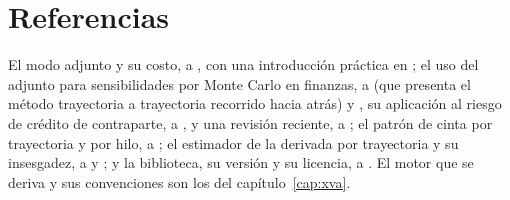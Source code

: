 \section{Referencias}\label{sec:cap16-referencias}

El modo adjunto y su costo, a \citet{griewank2008}, con una introducción práctica en \citet{naumann2011}; el uso del
adjunto para sensibilidades por Monte Carlo en finanzas, a \citet{giles2005} (que presenta el método
trayectoria a trayectoria recorrido hacia atrás) y \citet{capriotti2011}, su aplicación al riesgo de crédito de
contraparte, a \citet{capriotti2011b}, y una revisión reciente, a \citet{capriotti2024}; el patrón de cinta por
trayectoria y por hilo, a \citet{savine2018}; el estimador de la derivada por trayectoria y su insesgadez, a
\citet{broadie1996} y \citet[cap.~7]{glasserman2003}; y la biblioteca, su versión y su licencia, a \citet{xad2026}.
El motor que se deriva y sus convenciones son los del capítulo~\ref{cap:xva}.
